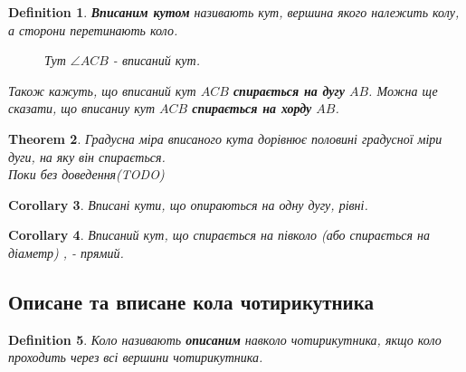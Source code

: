 \documentclass[a4paper, 10pt]{article}
\theoremstyle{theoremdd}
\newtheorem{theorem}{Theorem}[subsection]
\theoremstyle{theoremdd}
\theoremstyle{theoremdd}
\newtheorem{definition}[theorem]{Definition}
\theoremstyle{theoremdd}
\theoremstyle{theoremdd}
\theoremstyle{theoremdd}
\theoremstyle{theoremdd}
\theoremstyle{theoremdd}
\theoremstyle{theoremdd}
\newtheorem{corollary}[theorem]{Corollary}
\begin{document}
\begin{definition}
\textbf{Вписаним кутом} називають кут, вершина якого належить колу, а сторони перетинають коло.
\begin{figure}[H]
\centering
{}
\caption*{Тут $\angle ACB$ - вписаний кут.}
\end{figure}
Також кажуть, що вписаний кут $ACB$ \textbf{спирається на дугу} $AB$. Можна ще сказати, що вписаниу кут $ACB$ \textbf{спирається на хорду} $AB$.
\end{definition}

\begin{theorem}
Градусна міра вписаного кута дорівнює половині градусної міри дуги, на яку він спирається.\\
\textit{Поки без доведення}(TODO)
\end{theorem}

\begin{corollary}
Вписані кути, що опираються на одну дугу, рівні.
\end{corollary}

\begin{corollary}
Вписаний кут, що спирається на півколо (або спирається на діаметр) , - прямий.
\end{corollary}

\subsection{Описане та вписане кола чотирикутника}
\begin{definition}
Коло називають \textbf{описаним} навколо чотирикутника, якщо коло проходить через всі вершини чотирикутника.
\begin{figure}[H]
\centering
{}
\end{figure}
\end{definition}
\end{document}
